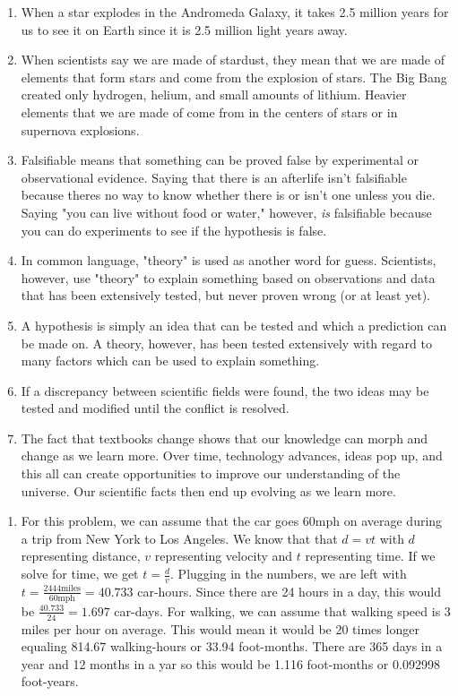 \documentclass[../hw1.tex]{subfiles}
\begin{document}
    \begin{enumerate}
        \item When a star explodes in the Andromeda Galaxy, it takes 2.5 million years for us to see it on Earth since it is 2.5 million light years away.
        \item When scientists say we are made of stardust, they mean that we are made of elements that form stars and come from the explosion of stars. The Big Bang created only hydrogen, helium, and small amounts of lithium. Heavier elements that we are made of come from in the centers of stars or in supernova explosions.
        \item Falsifiable means that something can be proved false by experimental or observational evidence. Saying that there is an afterlife isn't falsifiable because theres no way to know whether there is or isn't one unless you die. Saying "you can live without food or water," however, \emph{is} falsifiable because you can do experiments to see if the hypothesis is false.
        \item In common language, "theory" is used as another word for guess. Scientists, however, use "theory" to explain something based on observations and data that has been extensively tested, but never proven wrong (or at least yet). 
        \item A hypothesis is simply an idea that can be tested and which a prediction can be made on. A theory, however, has been tested extensively with regard to many factors which can be used to explain something. 
        \item If a discrepancy between scientific fields were found, the two ideas may be tested and modified until the conflict is resolved. 
        \item The fact that textbooks change shows that our knowledge can morph and change as we learn more. Over time, technology advances, ideas pop up, and this all can create opportunities to improve our understanding of the universe. Our scientific facts then end up evolving as we learn more.
    \end{enumerate}
    
    \begin{enumerate}
        \item For this problem, we can assume that the car goes 60mph on average during a trip from New York to Los Angeles. We know that that $d = vt$ with $d$ representing distance, $v$ representing velocity and $t$ representing time. If we solve for time, we get $t = \frac{d}{v}$. Plugging in the numbers, we are left with $t = \frac{2444\mathrm{miles}}{60\mathrm{mph}} = 40.733$ car-hours. Since there are 24 hours in a day, this would be $\frac{40.733}{24} = 1.697$ car-days. For walking, we can assume that walking speed is 3 miles per hour on average. This would mean it would be 20 times longer equaling 814.67 walking-hours or 33.94 foot-months. There are 365 days in a year and 12 months in a yar so this would be 1.116 foot-months or 0.092998 foot-years.
    \end{enumerate}
\end{document}
